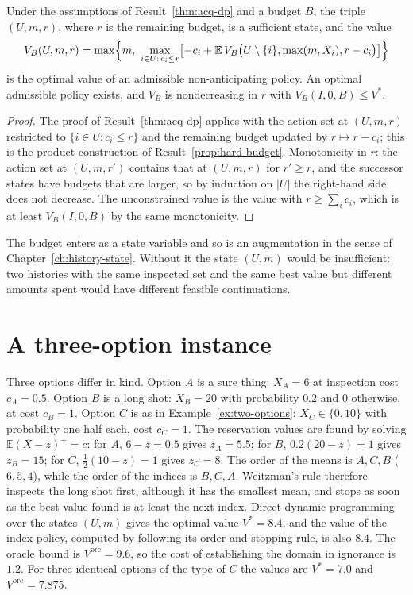 \begin{newresult}\label{prop:budget-acq}
Under the assumptions of Result~\ref{thm:acq-dp} and a budget $B$, the triple $(U,m,r)$, where $r$ is the remaining budget, is a sufficient state, and the value
\[
V_B(U,m,r)=\max\Bigl\{m,\ \max_{i\in U:\,c_i\le r}\bigl[-c_i+\mathbb E\,V_B\bigl(U\setminus\{i\},\max(m,X_i),r-c_i\bigr)\bigr]\Bigr\}
\]
is the optimal value of an admissible non-anticipating policy. An optimal admissible policy exists, and $V_B$ is nondecreasing in $r$ with $V_B(I,0,B)\le V^{*}$.
\end{newresult}
\begin{proof}
The proof of Result~\ref{thm:acq-dp} applies with the action set at $(U,m,r)$ restricted to $\{i\in U:c_i\le r\}$ and the remaining budget updated by $r\mapsto r-c_i$; this is the product construction of Result~\ref{prop:hard-budget}. Monotonicity in $r$: the action set at $(U,m,r')$ contains that at $(U,m,r)$ for $r'\ge r$, and the successor states have budgets that are larger, so by induction on $|U|$ the right-hand side does not decrease. The unconstrained value is the value with $r\ge\sum_ic_i$, which is at least $V_B(I,0,B)$ by the same monotonicity.
\end{proof}

The budget enters as a state variable and so is an augmentation in the sense of Chapter~\ref{ch:history-state}. Without it the state $(U,m)$ would be insufficient: two histories with the same inspected set and the same best value but different amounts spent would have different feasible continuations.


\section{A three-option instance}\label{sec:three-options}

Three options differ in kind. Option $A$ is a sure thing: $X_A=6$ at inspection cost $c_A=0.5$. Option $B$ is a long shot: $X_B=20$ with probability $0.2$ and $0$ otherwise, at cost $c_B=1$. Option $C$ is as in Example~\ref{ex:two-options}: $X_C\in\{0,10\}$ with probability one half each, cost $c_C=1$. The reservation values are found by solving $\mathbb E(X-z)^+=c$: for $A$, $6-z=0.5$ gives $z_A=5.5$; for $B$, $0.2(20-z)=1$ gives $z_B=15$; for $C$, $\tfrac12(10-z)=1$ gives $z_C=8$. The order of the means is $A,C,B$ ($6,5,4$), while the order of the indices is $B,C,A$. Weitzman's rule therefore inspects the long shot first, although it has the smallest mean, and stops as soon as the best value found is at least the next index. Direct dynamic programming over the states $(U,m)$ gives the optimal value $V^{*}=8.4$, and the value of the index policy, computed by following its order and stopping rule, is also $8.4$. The oracle bound is $V^{\mathrm{orc}}=9.6$, so the cost of establishing the domain in ignorance is $1.2$. For three identical options of the type of $C$ the values are $V^{*}=7.0$ and $V^{\mathrm{orc}}=7.875$.

